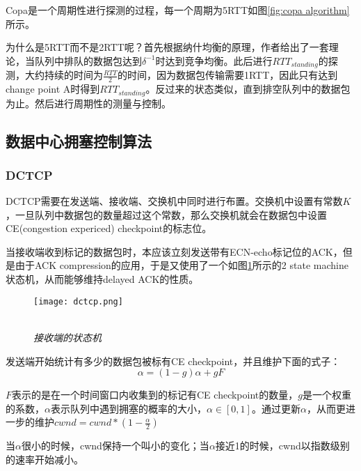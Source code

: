 \documentclass[a4paper, 12pt, UTF8]{ctexart}
\begin{document}
\par Copa是一个周期性进行探测的过程，每一个周期为5RTT如图\ref{fig:copa algorithm}所示。

\par 为什么是5RTT而不是2RTT呢？首先根据纳什均衡的原理，作者给出了一套理论，当队列中排队的数据包达到$\delta^{-1}$时达到竞争均衡。此后进行$RTT_{standing}$的探测，大约持续的时间为$\frac{RTT}{2}$的时间，因为数据包传输需要1RTT，因此只有达到change point A时得到$RTT_{standing}$。反过来的状态类似，直到排空队列中的数据包为止。然后进行周期性的测量与控制。

\subsection{数据中心拥塞控制算法}

\subsubsection{DCTCP}

\par DCTCP\cite{DBLP:conf/sigcomm/AlizadehGMPPPSS10}需要在发送端、接收端、交换机中同时进行布置。交换机中设置有常数$K$，一旦队列中数据包的数量超过这个常数，那么交换机就会在数据包中设置CE(congestion expericed) checkpoint的标志位。

\par 当接收端收到标记的数据包时，本应该立刻发送带有ECN-echo标记位的ACK，但是由于ACK compression的应用，于是又使用了一个如图\ref{fig:dctcp sm algorithm}所示的2 state machine状态机，从而能够维持delayed ACK的性质。

\begin{figure}[H]
	\centering \texttt{[image: dctcp.png]}
	\\ \hspace*{\fill} \\
	\caption{\em 接收端的状态机}
	\label{fig:dctcp sm algorithm}
\end{figure}

\par 发送端开始统计有多少的数据包被标有CE checkpoint，并且维护下面的式子：
$$
\alpha = (1-g)\alpha+gF
$$
\par $F$表示的是在一个时间窗口内收集到的标记有CE checkpoint的数量，$g$是一个权重的系数，$\alpha$表示队列中遇到拥塞的概率的大小，$\alpha \in [0, 1]$。通过更新$\alpha$，从而更进一步的维护$cwnd = cwnd*(1-\frac{\alpha}{2})$

\par 当$\alpha$很小的时候，cwnd保持一个叫小的变化；当$\alpha$接近1的时候，cwnd以指数级别的速率开始减小。
\end{document}
